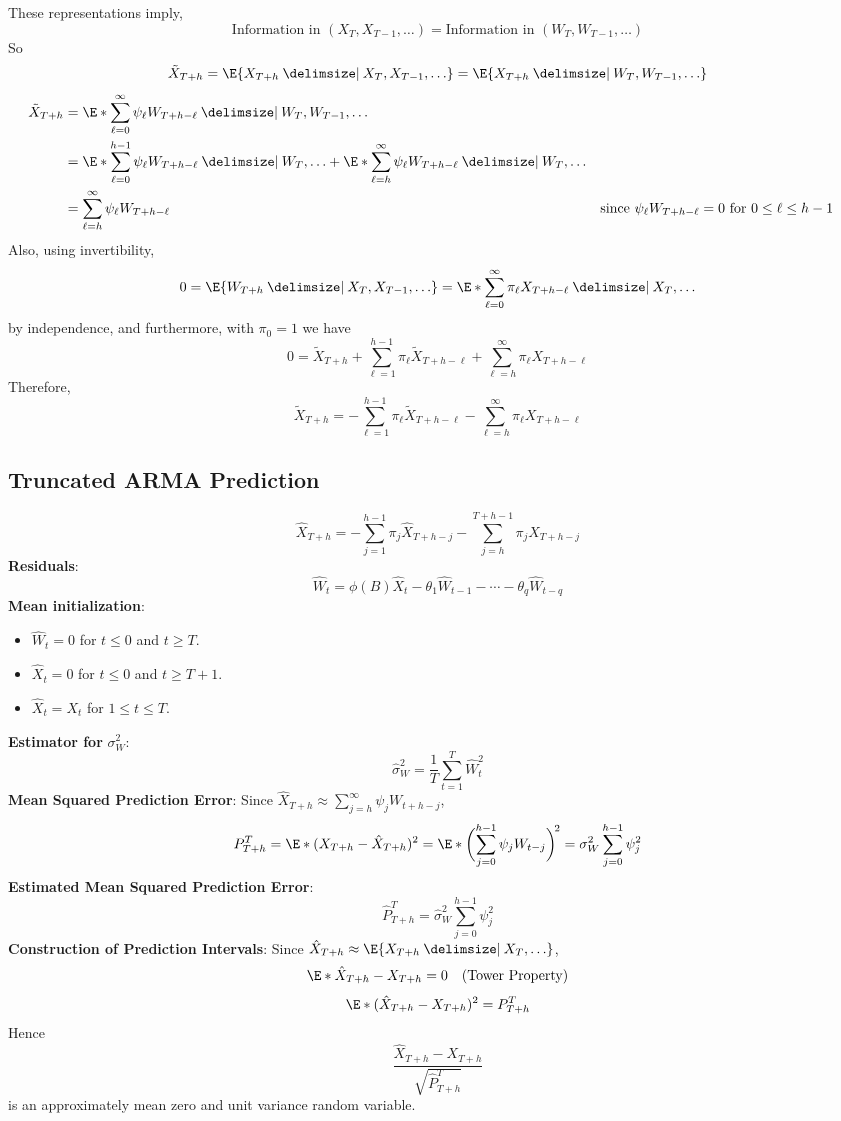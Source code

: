 These representations imply,
\[ \text{Information in }(X_T,X_{T-1},\ldots)=\text{Information in }
    (W_T,W_{T-1},\ldots) \]
So
\[ \tilde{X}_{T+h}=\E{X_{T+h}\given X_{T},X_{T-1},\ldots}=
    \E{X_{T+h}\given W_{T},W_{T-1},\ldots} \]
\begin{align*}
    \tilde{X}_{T+h}
     & =\E*{\sum_{\ell=0}^{\infty} \psi_\ell W_{T+h-\ell}\given W_T,W_{T-1},\ldots}                                                                       \\
     & =\E*{\sum_{\ell=0}^{h-1} \psi_\ell W_{T+h-\ell}\given W_T,\ldots}
    +\E*{\sum_{\ell=h}^{\infty} \psi_\ell W_{T+h-\ell}\given W_{T},\ldots}                                                                                \\
     & =\sum_{\ell=h}^{\infty} \psi_\ell W_{T+h-\ell}                               &  & \text{since $ \psi_\ell W_{T+h-\ell}=0 $ for $0\le \ell\le h-1$}
\end{align*}
Also, using invertibility,
\[ 0=\E{W_{T+h}\given X_T,X_{T-1},\ldots}=
    \E*{\sum_{\ell=0}^{\infty} \pi_\ell X_{T+h-\ell}\given X_T,\ldots} \]
by independence, and furthermore, with $ \pi_0=1 $ we have
\[ 0=\tilde{X}_{T+h}+\sum_{\ell=1}^{h-1} \pi_\ell \tilde{X}_{T+h-\ell}+
    \sum_{\ell=h}^{\infty} \pi_\ell X_{T+h-\ell} \]
Therefore,
\[ \tilde{X}_{T+h}=-\sum_{\ell=1}^{h-1} \pi_\ell \tilde{X}_{T+h-\ell}-
    \sum_{\ell=h}^{\infty} \pi_\ell X_{T+h-\ell} \]

\subsection*{Truncated ARMA Prediction}
\[ \hat{X}_{T+h}=-\sum_{j=1}^{h-1}\pi_j\hat{X}_{T+h-j}-\sum_{j=h}^{T+h-1} \pi_j X_{T+h-j}  \]
\textbf{Residuals}:
\[ \hat{W}_t=\phi(B)\hat{X}_t-\theta_1\hat{W}_{t-1}-\cdots-\theta_q \hat{W}_{t-q} \]
\textbf{Mean initialization}:
\begin{itemize}
    \item $ \hat{W}_t=0 $ for $ t\le 0 $ and $ t\ge T $.
    \item $ \hat{X}_t=0 $ for $ t\le 0 $ and $ t\ge T+1 $.
    \item $ \hat{X}_t=X_t $ for $ 1\le t\le T $.
\end{itemize}
\textbf{Estimator for} $ \sigma_W^2 $:
\[ \hat{\sigma}_W^2=
    \frac{1}{T} \sum_{t=1}^{T} \hat{W}_t^2 \]
\textbf{Mean Squared Prediction Error}:
Since $ \hat{X}_{T+h}\approx \sum_{j=h}^{\infty} \psi_j W_{t+h-j} $,
\[ P_{T+h}^T=\E*{(X_{T+h}-\hat{X}_{T+h})^2}
    =\E*{\biggl(\sum_{j=0}^{h-1} \psi_j W_{t-j}\biggr)^{\!2}}=\sigma_W^2 \sum_{j=0}^{h-1} \psi_j^2 \]
\textbf{Estimated Mean Squared Prediction Error}:
\[ \hat{P}_{T+h}^T=\hat{\sigma}_W^2 \sum_{j=0}^{h-1} \psi_j^2 \]
\textbf{Construction of Prediction Intervals}:
Since $ \hat{X}_{T+h}\approx \E{X_{T+h}\given X_T,\ldots} $,
\[ \E*{\hat{X}_{T+h}-X_{T+h}}=0\quad(\text{Tower Property}) \]
\[ \E*{(\hat{X}_{T+h}-X_{T+h})^2}=P_{T+h}^T \]
Hence
\[ \frac{\hat{X}_{T+h}-X_{T+h}}{\sqrt{\hat{P}_{T+h}^T}}  \]
is an approximately mean zero and unit variance random variable.

